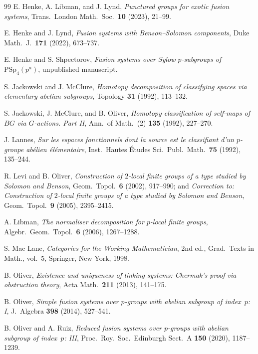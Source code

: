 \documentclass[10pt]{amsart}
\theoremstyle{definition}
\numberwithin{equation}{section}
\begin{document}
\begin{thebibliography}{99}
E. Henke, A. Libman, and J. Lynd,
{\it Punctured groups for exotic fusion systems},
Trans.\ London Math.\ Soc.\ \textbf{10} (2023), 21--99.

E. Henke and J. Lynd,
{\it Fusion systems with Benson--Solomon components},
Duke Math.\ J.\ \textbf{171} (2022), 673--737.

E. Henke and S. Shpectorov,
{\it Fusion systems over Sylow $p$-subgroups of $\mathrm{PSp}_4(p^a)$},
unpublished manuscript.

S. Jackowski and J. McClure,
{\it Homotopy decomposition of classifying spaces via elementary abelian
subgroups},
Topology \textbf{31} (1992), 113--132.

S. Jackowski, J. McClure, and B. Oliver,
{\it Homotopy classification of self-maps of $BG$ via $G$-actions. Part II},
Ann.\ of Math.\ (2) \textbf{135} (1992), 227--270.

J. Lannes,
{\it Sur les espaces fonctionnels dont la source est le classifiant d'un $p$-groupe ab\'elien \'el\'ementaire},
Inst.\ Hautes \'Etudes Sci.\ Publ.\ Math.\ \textbf{75} (1992), 135--244.

R. Levi and B. Oliver,
{\it Construction of $2$-local finite groups of a type studied by Solomon and Benson},
Geom.\ Topol.\ \textbf{6} (2002), 917--990; and
{\it Correction to: Construction of $2$-local finite groups of a type studied by Solomon and Benson},
Geom.\ Topol.\ \textbf{9} (2005), 2395--2415.

A. Libman,
{\it The normaliser decomposition for $p$-local finite groups},
Algebr.\ Geom.\ Topol.\ \textbf{6} (2006), 1267--1288.

S. Mac Lane,
{\it Categories for the Working Mathematician}, 2nd ed.,
Grad.\ Texts in Math., vol.~5,
Springer, New York, 1998.

B. Oliver,
{\it Existence and uniqueness of linking systems: Chermak's proof via obstruction theory},
Acta Math.\ \textbf{211} (2013), 141--175.

B. Oliver,
{\it Simple fusion systems over $p$-groups with abelian subgroup of index~$p$: I},
J.\ Algebra \textbf{398} (2014), 527--541.

B. Oliver and A. Ruiz,
{\it Reduced fusion systems over $p$-groups with abelian subgroup of index~$p$: III},
Proc.\ Roy.\ Soc.\ Edinburgh Sect.~A \textbf{150} (2020), 1187--1239.


\end{thebibliography}
\end{document}
